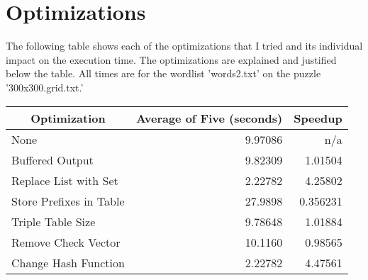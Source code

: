 \documentclass{article}
\begin{document}
\section{Optimizations}
The following table shows each of the optimizations that I tried and its individual impact on the execution time. The optimizations are explained and justified below the table. All times are for the wordlist 'words2.txt' on the puzzle '300x300.grid.txt.'
\begin{table}[h]
\centering
\begin{tabular}{|l|r|r|}
\hline
\multicolumn{1}{|c|}{\textbf{Optimization}} & \multicolumn{1}{c|}{\textbf{Average of Five (seconds)}} & \multicolumn{1}{c|}{\textbf{Speedup}} \\ \hline
None                                        & 9.97086                                                 & n/a                                   \\ \hline
Buffered Output                             & 9.82309                                                 & 1.01504                               \\ \hline
Replace List with Set                       & 2.22782                                                 & 4.25802                               \\ \hline
Store Prefixes in Table                     & 27.9898                                                 & 0.356231                              \\ \hline
Triple Table Size                           & 9.78648                                                 & 1.01884                               \\ \hline
Remove Check Vector                         & 10.1160                                                 & 0.98565                               \\ \hline
Change Hash Function                        & 2.22782                                                 & 4.47561                               \\ \hline
\end{tabular}
\end{table}
\end{document}
